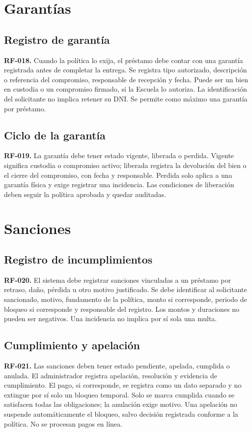 \section{Garant\'ias}

\subsection{Registro de garant\'ia}
\textbf{RF-018.} Cuando la pol\'itica lo exija, el pr\'estamo debe contar con una garant\'ia registrada antes de completar la entrega. Se registra tipo autorizado, descripci\'on o referencia del compromiso, responsable de recepci\'on y fecha. Puede ser un bien en custodia o un compromiso firmado, si la Escuela lo autoriza. La identificaci\'on del solicitante no implica retener su DNI. Se permite como m\'aximo una garant\'ia por pr\'estamo.

\subsection{Ciclo de la garant\'ia}
\textbf{RF-019.} La garant\'ia debe tener estado vigente, liberada o perdida. Vigente significa custodia o compromiso activo; liberada registra la devoluci\'on del bien o el cierre del compromiso, con fecha y responsable. Perdida solo aplica a una garant\'ia f\'isica y exige registrar una incidencia. Las condiciones de liberaci\'on deben seguir la pol\'itica aprobada y quedar auditadas.

\section{Sanciones}

\subsection{Registro de incumplimientos}
\textbf{RF-020.} El sistema debe registrar sanciones vinculadas a un pr\'estamo por retraso, da\~no, p\'erdida u otro motivo justificado. Se debe identificar al solicitante sancionado, motivo, fundamento de la pol\'itica, monto si corresponde, periodo de bloqueo si corresponde y responsable del registro. Los montos y duraciones no pueden ser negativos. Una incidencia no implica por s\'i sola una multa.

\subsection{Cumplimiento y apelaci\'on}
\textbf{RF-021.} Las sanciones deben tener estado pendiente, apelada, cumplida o anulada. El administrador registra apelaci\'on, resoluci\'on y evidencia de cumplimiento. El pago, si corresponde, se registra como un dato separado y no extingue por s\'i solo un bloqueo temporal. Solo se marca cumplida cuando se satisfacen todas las obligaciones; la anulaci\'on exige motivo. Una apelaci\'on no suspende autom\'aticamente el bloqueo, salvo decisi\'on registrada conforme a la pol\'itica. No se procesan pagos en l\'inea.

